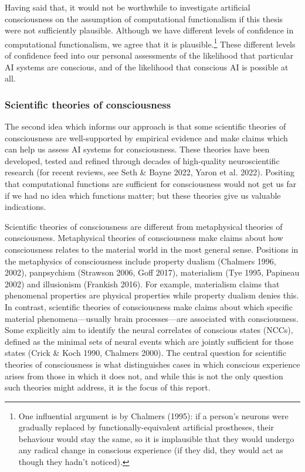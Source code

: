 \documentclass[12pt]{article}
\begin{document}
Having said that, it would not be worthwhile to investigate artificial consciousness on the assumption of computational functionalism if this thesis were not sufficiently plausible. Although we have different levels of confidence in computational functionalism, we agree that it is plausible.\footnote{One influential argument is by Chalmers (1995): if a person’s neurons were gradually replaced by functionally-equivalent artificial prostheses, their behaviour would stay the same, so it is implausible that they would undergo any radical change in conscious experience (if they did, they would act as though they hadn’t noticed).} These different levels of confidence feed into our personal assessments of the likelihood that particular AI systems are conscious, and of the likelihood that conscious AI is possible at all.

\subsubsection{Scientific theories of consciousness}

The second idea which informs our approach is that some scientific theories of consciousness are well-supported by empirical evidence and make claims which can help us assess AI systems for consciousness. These theories have been developed, tested and refined through decades of high-quality neuroscientific research (for recent reviews, see Seth \& Bayne 2022, Yaron et al. 2022). Positing that computational functions are sufficient for consciousness would not get us far if we had no idea which functions matter; but these theories give us valuable indications.

Scientific theories of consciousness are different from metaphysical theories of consciousness. Metaphysical theories of consciousness make claims about how consciousness relates to the material world in the most general sense. Positions in the metaphysics of consciousness include property dualism (Chalmers 1996, 2002), panpsychism (Strawson 2006, Goff 2017), materialism (Tye 1995, Papineau 2002) and illusionism (Frankish 2016). For example, materialism claims that phenomenal properties are physical properties while property dualism denies this. In contrast, scientific theories of consciousness make claims about which specific material phenomena—usually brain processes—are associated with consciousness. Some explicitly aim to identify the neural correlates of conscious states (NCCs), defined as the minimal sets of neural events which are jointly sufficient for those states (Crick \& Koch 1990, Chalmers 2000). The central question for scientific theories of consciousness is what distinguishes cases in which conscious experience arises from those in which it does not, and while this is not the only question such theories might address, it is the focus of this report.
\end{document}
